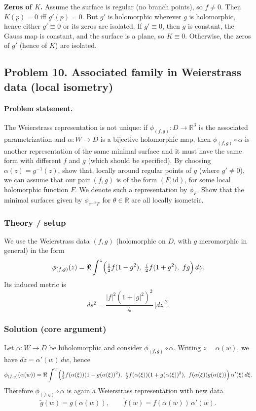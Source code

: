 \documentclass[12pt,a4paper]{article}
\theoremstyle{plain}
\theoremstyle{definition}      %
\begin{document}
	\medskip
	\textbf{Zeros of $K$.}
	Assume the surface is regular (no branch points), so $f\neq 0$.
	Then $K(p)=0$ iff $g'(p)=0$.
	But $g'$ is holomorphic wherever $g$ is holomorphic, hence either $g'\equiv 0$ or its zeros are isolated.
	If $g'\equiv 0$, then $g$ is constant, the Gauss map is constant, and the surface is a plane, so $K\equiv 0$.
	Otherwise, the zeros of $g'$ (hence of $K$) are isolated.
	
\subsection*{Problem 10. Associated family in Weierstrass data (local isometry)}

\paragraph{\textbf{Problem statement.}}
The Weierstrass representation is not unique: if $\phi_{(f,g)}:D\to\mathbb{R}^3$ is the associated parametrization and
$\alpha:W\to D$ is a bijective holomorphic map, then $\phi_{(f,g)}\circ\alpha$ is another representation of the same minimal
surface and it must have the same form with different $f$ and $g$ (which should be specified).
By choosing $\alpha(z)=g^{-1}(z)$, show that, locally around regular points of $g$ (where $g'\neq 0$), we can assume
that our pair $(f,g)$ is of the form $(F,\mathrm{id})$, for some local holomorphic function $F$. We denote such a
representation by $\phi_F$. Show that the minimal surfaces given by $\phi_{e^{-i\theta}F}$ for $\theta\in\mathbb{R}$
are all locally isometric.

\medskip

\subsubsection*{Theory / setup}
We use the Weierstrass data $(f,g)$ (holomorphic on $D$, with $g$ meromorphic in general) in the form
\[
\phi_{(f,g)}(z)
=
\Re\int^z
\Bigl(\tfrac12 f(1-g^2),\ \tfrac{i}{2}f(1+g^2),\ fg\Bigr)\,dz.
\]
Its induced metric is
\[
ds^2
=
\frac{|f|^2(1+|g|^2)^2}{4}\,|dz|^2.
\]

\medskip

\subsubsection*{Solution (core argument)}
Let $\alpha:W\to D$ be biholomorphic and consider $\phi_{(f,g)}\circ\alpha$. Writing $z=\alpha(w)$, we have
$dz=\alpha'(w)\,dw$, hence
\[
\phi_{(f,g)}(\alpha(w))
=
\Re\int^w
\Bigl(\tfrac12 f(\alpha(\xi))(1-g(\alpha(\xi))^2),\ \tfrac{i}{2}f(\alpha(\xi))(1+g(\alpha(\xi))^2),\ f(\alpha(\xi))g(\alpha(\xi))\Bigr)
\,\alpha'(\xi)\,d\xi.
\]
Therefore $\phi_{(f,g)}\circ\alpha$ is again a Weierstrass representation with new data
\[
\tilde g(w)=g(\alpha(w)),\qquad
\tilde f(w)=f(\alpha(w))\,\alpha'(w).
\]
\end{document}
